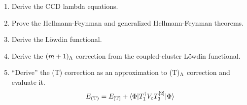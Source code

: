 \documentclass[11pt]{article}
\begin{document}
\begin{enumerate}
\item
Derive the CCD lambda equations.

\item
Prove the Hellmann-Feynman and generalized Hellmann-Feynman theorems.

\item
Derive the L\"owdin functional.

\item
Derive the $(m+1)_{\Lambda }$ correction from the coupled-cluster L\"owdin functional.

\item
``Derive'' the (T) correction as an approximation to (T)$_{\Lambda }$ correction and evaluate it.
\begin{align}
  E_{(\mathrm{T})}
=
  E_{[\mathrm{T}]}
+
  \langle\Phi |
    T_1^\dagger
    V_{\mathrm{c}}
    T_3^{[2]}
  |\Phi \rangle
\end{align}


\end{enumerate}
\end{document}
